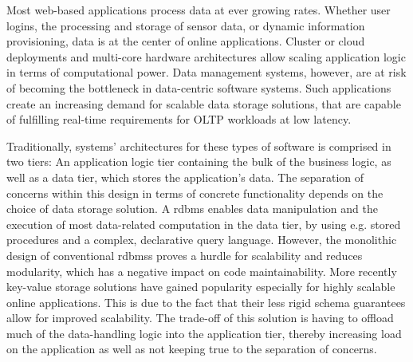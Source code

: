 
  Most web-based applications process data at ever growing rates.
  Whether user logins, the processing and storage of sensor data, or dynamic information provisioning, data is at the center of online applications.
  Cluster or cloud deployments and multi-core hardware architectures allow scaling application logic in terms of computational power.
  Data management systems, however, are at risk of becoming the bottleneck in data-centric software systems.
  Such applications create an increasing demand for scalable data storage solutions, that are capable of fulfilling real-time requirements for OLTP workloads at low latency. %

  Traditionally, systems' architectures for these types of software is comprised in two tiers:
  An application logic tier containing the bulk of the business logic, as well as a data tier, which stores the application's data.
  The separation of concerns within this design in terms of concrete functionality depends on the choice of data storage solution.
  A \gls{rdbms} enables data manipulation and the execution of most data-related computation in the data tier, by using e.g. stored procedures and a complex, declarative query language.
  However, the monolithic design of conventional \glspl{rdbms} proves a hurdle for scalability and reduces modularity, which has a negative impact on code maintainability. %
  More recently key-value storage solutions have gained popularity especially for highly scalable online applications.
  This is due to the fact that their less rigid schema guarantees allow for improved scalability. %
  The trade-off of this solution is having to offload much of the data-handling logic into the application tier, thereby increasing load on the application as well as not keeping true to the separation of concerns.

